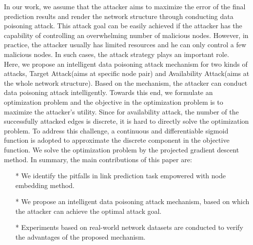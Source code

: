 \documentclass{acmtog} %
\begin{document}
\indent In our work, we assume that the attacker aims to maximize the error of the final prediction results and render the network structure through conducting data poisoning attack. This attack goal can be easily achieved if the attacker has the capability of controlling an overwhelming number of malicious nodes. However, in practice, the attacker usually has limited resources and he can only control a few malicious nodes. In such cases, the attack strategy plays an important role. \\
\indent Here, we propose an intelligent data poisoning attack mechanism for two kinds of attacks, Target Attack(aims at specific node pair) and Availability Attack(aims at the whole network structure). Based on the mechanism, the attacker can conduct data poisoning attack intelligently. Towards this end, we formulate an optimization problem and the objective in the optimization problem is to maximize the attacker's utility. Since for availability attack, the number of the successfully attacked edges is discrete, it is hard to directly solve the optimization problem. To address this challenge, a continuous and differentiable sigmoid function is adopted to approximate the discrete component in the objective function. We solve the optimization problem by the projected gradient descent method. In summary, the main contributions of this paper are:\\

\begin{itemize}
	\item[*] We identify the pitfalls in link prediction task empowered with node embedding method. 
	\item[*] We propose an intelligent data poisoning attack mechanism, based on which the attacker can achieve the optimal attack goal.
	\item[*] Experiments based on real-world network datasets are conducted to verify the advantages of the proposed
	mechanism.
\end{itemize}
\end{document}
